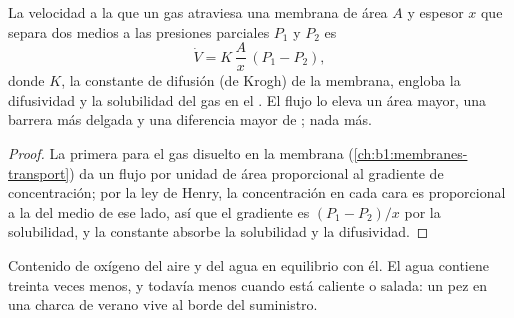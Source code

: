 \begin{theorem}\label{thm:b1:gas-exchange:fick}
La velocidad a la que un gas atraviesa una membrana de área $A$ y espesor
$x$ que separa dos medios a las presiones parciales $P_1$ y $P_2$ es
\[
\dot V = K\,\frac{A}{x}\,(P_1 - P_2),
\]
donde $K$, la constante de difusión (de Krogh) de la membrana, engloba la
difusividad y la solubilidad del gas en el . El flujo lo eleva un área
mayor, una barrera más delgada y una diferencia mayor de ;
nada más.
\end{theorem}
\begin{proof}
La primera  para el gas disuelto en la membrana
(\cref{ch:b1:membranes-transport}) da un flujo por unidad de área
proporcional al gradiente de concentración; por la ley de Henry, la
concentración en cada cara es proporcional a la  del medio de
ese lado, así que el gradiente es $(P_1 - P_2)/x$ por la solubilidad, y la
constante absorbe la solubilidad y la difusividad.
\end{proof}

\begin{omfigure}

{\small Contenido de oxígeno del aire y del agua en equilibrio con él. El
agua contiene treinta veces menos, y todavía menos cuando está caliente o
salada: un pez en una charca de verano vive al borde del suministro.}
\end{omfigure}

